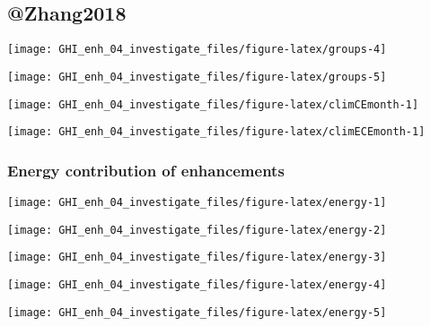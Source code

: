 \documentclass[
  10pt,
  a4paper,oneside]{article}
\begin{document}
\hypertarget{zhang2018}{%
\subsection{@Zhang2018}\label{zhang2018}}

\begin{center}\texttt{[image: GHI\_enh\_04\_investigate\_files/figure-latex/groups-4]} \end{center}

\begin{center}\texttt{[image: GHI\_enh\_04\_investigate\_files/figure-latex/groups-5]} \end{center}

\begin{center}\texttt{[image: GHI\_enh\_04\_investigate\_files/figure-latex/climCEmonth-1]} \end{center}

\begin{center}\texttt{[image: GHI\_enh\_04\_investigate\_files/figure-latex/climECEmonth-1]} \end{center}

\newpage
\FloatBarrier

\hypertarget{energy-contribution-of-enhancements}{%
\subsubsection{Energy contribution of enhancements}\label{energy-contribution-of-enhancements}}

\begin{center}\texttt{[image: GHI\_enh\_04\_investigate\_files/figure-latex/energy-1]} \end{center}

\begin{center}\texttt{[image: GHI\_enh\_04\_investigate\_files/figure-latex/energy-2]} \end{center}

\begin{center}\texttt{[image: GHI\_enh\_04\_investigate\_files/figure-latex/energy-3]} \end{center}

\begin{center}\texttt{[image: GHI\_enh\_04\_investigate\_files/figure-latex/energy-4]} \end{center}

\begin{center}\texttt{[image: GHI\_enh\_04\_investigate\_files/figure-latex/energy-5]} \end{center}
\end{document}
